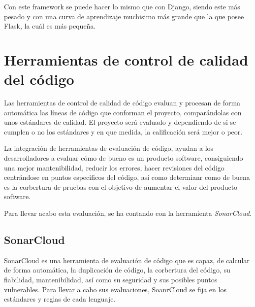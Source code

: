Con este framework se puede hacer lo mismo que con Django, siendo este más pesado y con una curva de aprendizaje muchisimo más grande que la que posee Flask, la cuál es más pequeña.



\clearpage

\section{Herramientas de control de calidad del código} \label{calidad_codigo}
Las herramientas de control de calidad de código evaluan y procesan de forma automática las líneas de código que conforman el proyecto, comparándolas con unos estándares de calidad. El proyecto será evaluado y dependiendo de si se cumplen o no los estándares y en que medida, la calificación será mejor o peor.

La integración de herramientas de evaluación de código, ayudan a los desarrolladores a evaluar cómo de bueno es un producto software, consiguiendo una mejor mantenibilidad, reducir los errores, hacer revisiones del código centrándose en puntos especificos del código, así como determianr como de buena es la corbertura de pruebas con el objetivo de aumentar el valor del producto software.

Para llevar acabo esta evaluación, se ha contando con la herramienta \textit{SonarCloud}. 

\subsection*{SonarCloud}

SonarCloud \cite{sonar_cloud} es una herramienta de evaluación de código que es capaz, de calcular de forma automática, la duplicación de código, la corbertura del código, su fiabilidad, mantenibilidad, así como su seguridad y sus posibles puntos vulnerables.
Para llevar a cabo sus evaluaciones, SoanrCloud se fija en los estándares y reglas de cada lenguaje.

